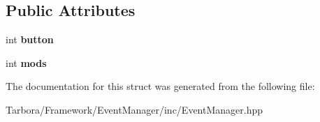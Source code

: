 \subsection*{Public Attributes}
\begin{DoxyCompactItemize}
\item 
\mbox{\label{structTarbora_1_1MouseButtonPressEvent_a7ce530277e7b3764519484ebb126d296}} 
int {\bfseries button}
\item 
\mbox{\label{structTarbora_1_1MouseButtonPressEvent_a47103800ed5731d95d77d1744452b263}} 
int {\bfseries mods}
\end{DoxyCompactItemize}


The documentation for this struct was generated from the following file\+:\begin{DoxyCompactItemize}
\item 
Tarbora/\+Framework/\+Event\+Manager/inc/Event\+Manager.\+hpp\end{DoxyCompactItemize}
